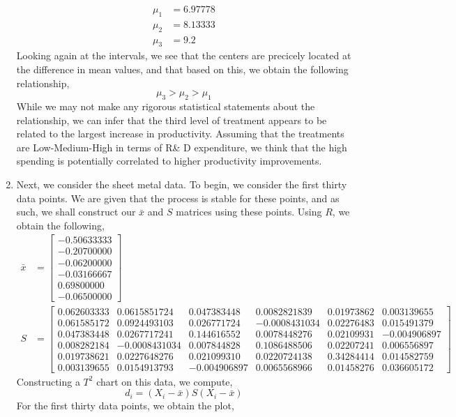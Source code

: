 \documentclass[letterpaper,10pt]{article}
\begin{document}
\begin{enumerate}
\begin{align*}
\mu_1 &= 6.97778\\
\mu_2 &= 8.13333\\
\mu_3 &= 9.2
\end{align*}
Looking again at the intervals, we see that the centers are precicely located at the difference in mean values, and that based on this, we obtain the following relationship,
\[\mu_3>\mu_2>\mu_1\]
While we may not make any rigorous statistical statements about the relationship, we can infer that the third level of treatment appears to be related to the largest increase in productivity. Assuming that the treatments are Low-Medium-High in terms of R\& D expenditure, we think that the high spending is potentially correlated to higher productivity improvements. 
\item Next, we consider the sheet metal data. To begin, we consider the first thirty data points. We are given that the process is stable for these points, and as such, we shall construct our $\bar{x}$ and $S$ matrices using these points. Using $R$, we obtain the following,
\begin{align*}
\bar{x} &= \begin{bmatrix}
-0.50633333 \\ -0.20700000\\ -0.06200000\\ -0.03166667\\  0.69800000\\ -0.06500000
\end{bmatrix}\\
S &= \begin{bmatrix}
0.062603333 & 0.0615851724 & 0.047383448 & 0.0082821839 & 0.01973862 & 0.003139655\\
0.061585172 & 0.0924493103 & 0.026771724 & -0.0008431034 & 0.02276483 & 0.015491379\\
0.047383448 & 0.0267717241 & 0.144616552 & 0.0078448276 & 0.02109931 & -0.004906897\\
0.008282184 & -0.0008431034 & 0.007844828 & 0.1086488506 & 0.02207241 & 0.006556897\\
0.019738621 & 0.0227648276 & 0.021099310 & 0.0220724138 & 0.34284414 & 0.014582759\\
0.003139655 & 0.0154913793 & -0.004906897 & 0.0065568966 & 0.01458276 & 0.036605172
\end{bmatrix}
\end{align*}
Constructing a $T^2$ chart on this data, we compute,
\[d_i=(X_i-\bar{x})S(X_i-\bar{x})\]
For the first thirty data points, we obtain the plot,

\end{enumerate}
\end{document}

